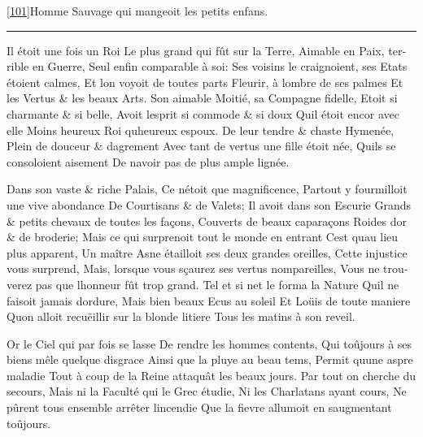 \documentclass[14pt,a4paper]{memoir}
\begin{document}
\begin{otherlanguage}{french}
\protect\hypertarget{4533318093929944247_33931-h-2.htm.xhtmlux5cux23Footnote_101}{}{}
\protect\hyperlink{4533318093929944247_33931-h-2.htm.xhtmlux5cux23FNanchor_101}{{{[}101{]}}}Homme
Sauvage qui mangeoit les petits enfans.

\begin{center}\rule{0.5\linewidth}{0.5pt}\end{center}

{Il étoit une fois un Roi} {Le plus grand qui fût sur la Terre,}
{Aimable en Paix, terrible en Guerre,} {Seul enfin comparable à soi:}
{Ses voisins le craignoient, ses Etats étoient calmes,} {Et
l\textquotesingle on voyoit de toutes parts} {Fleurir, à
l\textquotesingle ombre de ses palmes} {Et les Vertus \& les beaux
Arts.} {Son aimable Moitié, sa Compagne fidelle,} {Etoit si charmante \&
si belle,} {Avoit l\textquotesingle esprit si commode \& si doux}
{Qu\textquotesingle il étoit encor avec elle} {Moins heureux Roi
qu\textquotesingle heureux espoux.} {De leur tendre \& chaste Hymenée,}
{Plein de douceur \& d\textquotesingle agrement} {Avec tant de vertus
une fille étoit née,} {Qu\textquotesingle ils se consoloient aisement}
{De n\textquotesingle avoir pas de plus ample lignée.}

{Dans son vaste \& riche Palais,} {Ce n\textquotesingle étoit que
magnificence,} {Partout y fourmilloit une vive abondance} {De Courtisans
\& de Valets;} {Il avoit dans son Escurie} {Grands \& petits chevaux de
toutes les façons, } {Couverts de beaux caparaçons} {Roides
d\textquotesingle or \& de broderie;} {Mais ce qui surprenoit tout le
monde en entrant } {C\textquotesingle est qu\textquotesingle au lieu
plus apparent,} {Un maître Asne étailloit ses deux grandes oreilles,}
{Cette injustice vous surprend,} {Mais, lorsque vous sçaurez ses vertus
nompareilles,} {Vous ne trouverez pas que l\textquotesingle honneur fût
trop grand.} {Tel et si net le forma la Nature} {Qu\textquotesingle il
ne faisoit jamais d\textquotesingle ordure,} {Mais bien beaux Ecus au
soleil} {Et Loüis de toute maniere} {Qu\textquotesingle on alloit
recuëillir sur la blonde litiere} {Tous les matins à son reveil.}

{Or le Ciel qui par fois se lasse} {De rendre les hommes contents,} {Qui
toûjours à ses biens mêle quelque disgrace} {Ainsi que la pluye au beau
tems,} {Permit qu\textquotesingle une aspre maladie} {Tout à coup de la
Reine attaquât les beaux jours. } {Par tout on cherche du secours,}
{Mais ni la Faculté qui le Grec étudie,} {Ni les Charlatans ayant
cours,} {Ne pûrent tous ensemble arrêter l\textquotesingle incendie}
{Que la fievre allumoit en s\textquotesingle augmentant toûjours. }


\end{otherlanguage}
\end{document}
